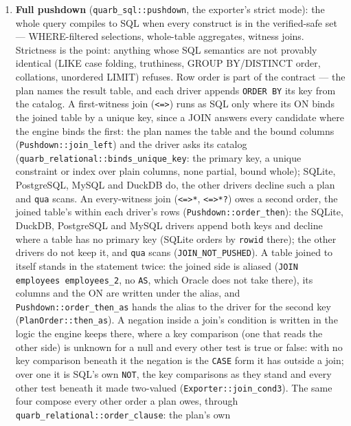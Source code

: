 \documentclass{report}
\begin{document}
\begin{enumerate}
  \item \textbf{Full pushdown} (\texttt{quarb\_sql::pushdown},
    the exporter's strict mode): the whole query compiles to SQL
    when every construct is in the verified-safe set —
    WHERE-filtered selections, whole-table aggregates, witness
    joins. Strictness is the point: anything whose SQL semantics
    are not provably identical (LIKE case folding, truthiness,
    GROUP BY/DISTINCT order, collations, unordered LIMIT) refuses.
    Row order is part of the contract — the plan names the result
    table, and each driver appends \texttt{ORDER BY} its key from
    the catalog. A first-witness join (\texttt{<=>}) runs as SQL
    only where its ON binds the joined table by a unique key, since
    a JOIN answers every candidate where the engine binds the
    first: the plan names the table and the bound columns
    (\texttt{Pushdown::join\_left}) and the driver asks its catalog
    (\texttt{quarb\_relational::binds\_unique\_key}: the primary
    key, a unique constraint or index over plain columns, none
    partial, bound whole); SQLite, PostgreSQL, MySQL and DuckDB
    do, the other drivers decline such a plan and \texttt{qua}
    scans. An every-witness join (\texttt{<=>*},
    \texttt{<=>*?}) owes a second order, the joined table's within
    each driver's rows (\texttt{Pushdown::order\_then}): the
    SQLite, DuckDB, PostgreSQL and MySQL drivers append both keys
    and decline where a table has no primary key (SQLite orders by
    \texttt{rowid} there); the other drivers do not keep it, and
    \texttt{qua} scans (\texttt{JOIN\_NOT\_PUSHED}). A table
    joined to itself stands in the statement twice: the joined
    side is aliased (\texttt{JOIN employees employees\_2}, no
    \texttt{AS}, which Oracle does not take there), its columns
    and the ON are written under the alias, and
    \texttt{Pushdown::order\_then\_as} hands the alias to the
    driver for the second key (\texttt{PlanOrder::then\_as}). A
    negation inside a join's condition is written in the logic
    the engine keeps there, where a key comparison (one that
    reads the other side) is unknown for a null and every other
    test is true or false: with no key comparison beneath it the
    negation is the \texttt{CASE} form it has outside a join;
    over one it is SQL's own \texttt{NOT}, the key comparisons
    as they stand and every other test beneath it made two-valued
    (\texttt{Exporter::join\_cond3}). The
    same
    four compose every other order a plan owes, through
    \texttt{quarb\_relational::order\_clause}: the plan's own

\end{enumerate}
\end{document}
